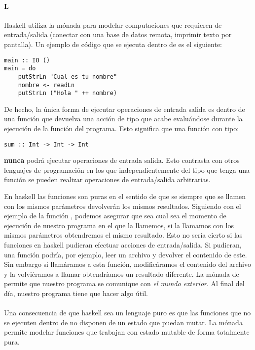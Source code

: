 \paragraph{L }
Haskell utiliza la mónada  para modelar computaciones que
requieren de entrada/salida (conectar con una base de datos remota,
imprimir texto por pantalla). Un ejemplo de código que se ejecuta
dentro de  es el siguiente:
\begin{verbatim}
main :: IO ()
main = do
    putStrLn "Cual es tu nombre"
    nombre <- readLn
    putStrLn ("Hola " ++ nombre)
\end{verbatim}
De hecho, la única forma de ejecutar operaciones de entrada salida
es dentro de una función que devuelva una acción de tipo 
que acabe evaluándose durante la ejecución de la función 
del programa. Esto significa que una función con tipo:
\begin{verbatim}
sum :: Int -> Int -> Int
\end{verbatim}
\textbf{nunca} podrá ejecutar operaciones de entrada salida. Esto
contrasta con otros lenguajes de programación en los que
independientemente del tipo que tenga una función se pueden realizar
operaciones de entrada/salida arbitrarias.

En haskell las funciones son puras en el sentido de que se siempre
que se llamen con los mismos parámetros devolverán los mismos resultados.
Siguiendo con el ejemplo de la función , podemos asegurar
que sea cual sea el momento de ejecución de nuestro programa en el que
la llamemos, si la llamamos con los mismos parámetros obtendremos
el mismo resultado. Esto no sería cierto si las funciones en haskell
pudieran efectuar acciones de entrada/salida. Si pudieran, una
función podría, por ejemplo, leer un archivo y devolver el contenido
de este. Sin embargo si llamáramos a esta función, modificáramos el
contenido del archivo y la volviéramos a llamar obtendríamos un
resultado diferente. La mónada de  permite que nuestro
programa se comunique con
\textit{el mundo exterior}. Al final del día, nuestro programa tiene
que hacer algo útil.

\paragraph{}
Una consecuencia de que haskell sea un lenguaje puro es que
las funciones que no se ejecuten dentro de
 no disponen de un estado que puedan mutar.
La mónada  permite modelar funciones que trabajan
con estado mutable de forma totalmente pura.
